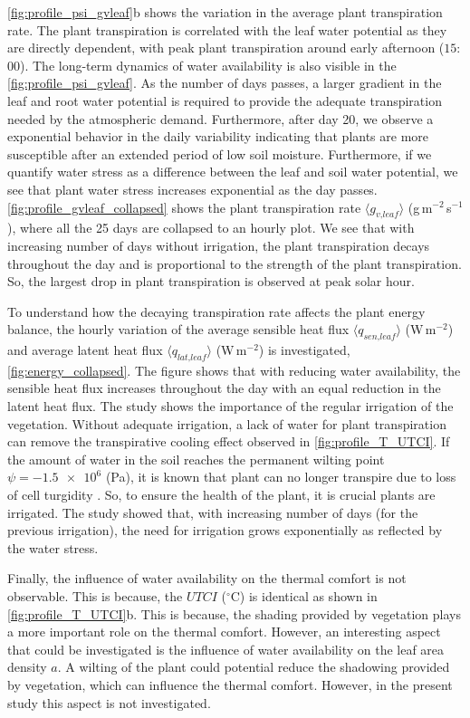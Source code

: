 \cref{fig:profile_psi_gvleaf}b shows the variation in the average plant transpiration rate. The plant transpiration is correlated with the leaf water potential as they are directly dependent, with peak plant transpiration around early afternoon ($15$:$00$).  The long-term dynamics of water availability is also visible in the \cref{fig:profile_psi_gvleaf}. As the number of days passes, a larger gradient in the leaf and root water potential is required to provide the adequate transpiration needed by the atmospheric demand. Furthermore, after day 20, we observe a exponential behavior in the daily variability indicating that plants are more susceptible after an extended period of low soil moisture. Furthermore, if we quantify water stress as a difference between the leaf and soil water potential, we see that plant water stress increases exponential as the day passes. \cref{fig:profile_gvleaf_collapsed} shows the plant transpiration rate $\langle g_{\textit{v,leaf}} \rangle$ (g\,m$^{-2}$\,s$^{-1}$), where all the 25 days are collapsed to an hourly plot. We see that with increasing number of days without irrigation, the plant transpiration decays throughout the day and is proportional to the strength of the plant transpiration. So, the largest drop in plant transpiration is observed at peak solar hour.

To understand how the decaying transpiration rate affects the plant energy balance, the hourly variation of the average sensible heat flux $\langle q_{\textit{sen,leaf}} \rangle$ (W\,m$^{-2}$) and  average latent heat flux $\langle q_{\textit{lat,leaf}} \rangle$ (W\,m$^{-2}$) is investigated, \cref{fig:energy_collapsed}. The figure shows that with reducing water availability, the sensible heat flux increases throughout the day with an equal reduction in the latent heat flux. The study shows the importance of the regular irrigation of the vegetation. Without adequate irrigation, a lack of water for plant transpiration can remove the transpirative cooling effect observed in \cref{fig:profile_T_UTCI}. If the amount of water in the soil reaches the permanent wilting point $\psi = \num{-1.5e6}$ (Pa), it is known that plant can no longer transpire due to loss of cell turgidity \citep{Idso1977}. So, to ensure the health of the plant, it is crucial plants are irrigated. The study showed that, with increasing number of days (for the previous irrigation), the need for irrigation grows exponentially as reflected by the water stress.

Finally, the influence of water availability on the thermal comfort is not observable. This is because, the $UTCI$  ($^{\circ}$C) is identical as shown in \cref{fig:profile_T_UTCI}b. This is because, the shading provided by vegetation plays a more important role on the thermal comfort. However, an interesting aspect that could be investigated is the influence of water availability on the leaf area density $a$. A wilting of the plant could potential reduce the shadowing provided by vegetation, which can influence the thermal comfort. However, in the present study this aspect is not investigated.

